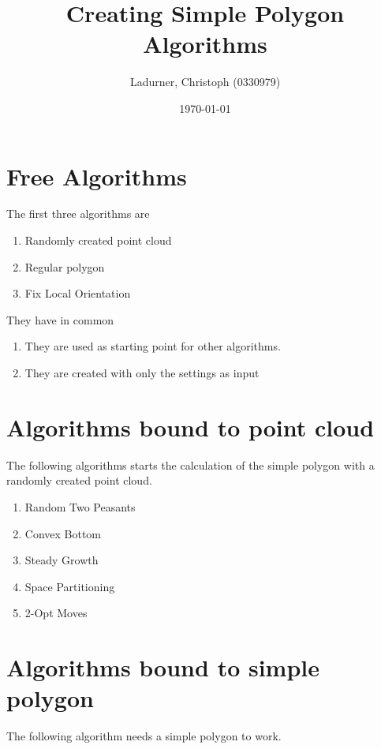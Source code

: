 \documentclass[
  titlepage
]{scrartcl}
\title{Creating Simple Polygon Algorithms}
\author{Ladurner, Christoph (0330979)}
\date{\today}
\newcounter{i}
\begin{document}
\hypersetup{pageanchor=false}
\thispagestyle{empty}
\maketitle


\tableofcontents
\listoffigures

\pagebreak
\hypersetup{pageanchor=true}

\section{Free Algorithms}
The first three algorithms are
\begin{enumerate}
  \item Randomly created point cloud
  \item Regular polygon
  \item Fix Local Orientation
\end{enumerate}

They have in common
\begin{enumerate}
  \item They are used as starting point for other algorithms.
  \item They are created with only the settings as input
\end{enumerate}





\pagebreak

\section{Algorithms bound to point cloud}
The following algorithms starts the calculation of the simple
polygon with a randomly created point cloud.

\begin{enumerate}
  \item Random Two Peasants
  \item Convex Bottom
  \item Steady Growth
  \item Space Partitioning
  \item 2-Opt Moves
\end{enumerate}







\clearpage

\section{Algorithms bound to simple polygon}
The following algorithm needs a simple polygon to work.


\end{document}
